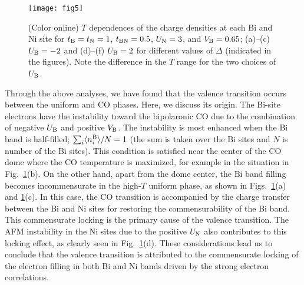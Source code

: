 \documentclass[aps,twocolumn,prl,showpacs,preprintnumbers,amsmath,amssymb]{revtex4}
\begin{document}
\begin{figure}[t]
\begin{center}
\texttt{[image: fig5]}
\end{center}
\caption{(Color online) 
$T$ dependences of the charge densities at each Bi and Ni site for $t_{\rm B} = t_{\rm N} =1$, $t_{\rm BN} = 0.5$, $U_{\rm N} = 3$, and $V_{\rm B} = 0.65$; (a)--(c) $U_{\rm B} = -2$ and (d)--(f) $U_{\rm B} = 2$ for different values of $\Delta$ (indicated in the figures). 
Note the difference in the $T$ range for the two choices of $U_{\rm B}$. 
}
\label{fig:op_ft}
\end{figure}
%
%
%
Through the above analyses, we have found that the valence transition occurs between the uniform and CO phases. 
Here, we discuss its origin. 
The Bi-site electrons have the instability toward the bipolaronic CO due to the combination of negative $U_{\rm B}$ and positive $V_{\rm B}$. 
The instability is most enhanced when the Bi band is half-filled; $\sum_{i} \langle n_{i}^{\rm B} \rangle/ N = 1$ (the sum is taken over the Bi sites and $N$ is number of the Bi sites). 
This condition is satisfied near the center of the CO dome where the CO temperature is maximized, for example in the situation in Fig.~\ref{fig:op_ft}(b). 
On the other hand, apart from the dome center, the Bi band filling becomes incommensurate in the high-$T$ uniform phase, as shown in Figs.~\ref{fig:op_ft}(a) and \ref{fig:op_ft}(c). 
In this case, the CO transition is accompanied by the charge transfer between the Bi and Ni sites for restoring the commensurability of the Bi band. 
This commensurate locking is the primary cause of the valence transition. 
The AFM instability in the Ni sites due to the positive $U_{\rm N}$ also contributes to this locking effect, as clearly seen in Fig.~\ref{fig:op_ft}(d). 
These considerations lead us to conclude that the valence transition is attributed to the commensurate locking of the electron filling in both Bi and Ni bands driven by the strong electron correlations. 
\end{document}
